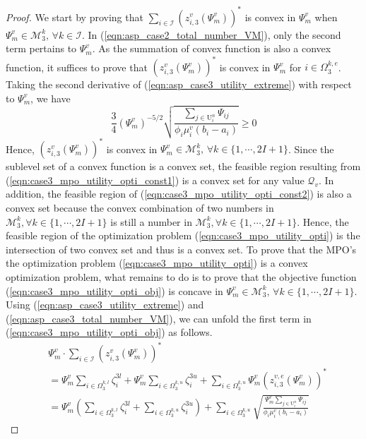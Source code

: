 \documentclass[conference]{IEEEtran}
\begin{document}
\begin{proof}
We start by proving that $\sum_{i \in \mathcal{I}} (z_{i,3}^v(\Psi_m^v))^*$ is convex in $\Psi_m^v$ when $\Psi_m^v \in \mathcal{M}_3^k,\, \forall k \in \mathcal{I}$. In (\ref{eqn:asp_case2_total_number_VM}), only the second term pertains to $\Psi_m^v$. As the summation of convex function is also a convex function, it suffices to prove that $(z_{i,3}^v(\Psi_m^v))^*$ is convex in $\Psi_m^v$ for $i \in \Omega_3^{k,e}$. Taking the second derivative of (\ref{eqn:asp_case3_utility_extreme}) with respect to $\Psi_m^v$, we have
\begin{equation}
\frac{3}{4}(\Psi_m^v)^{-5/2}\sqrt{\frac{\sum_{j \in \mathrm{U}_i^n}\Psi_{ij}}{\phi_i \mu_i^v(b_i-a_i)}}  \geq 0
\end{equation}
Hence, $(z_{i,3}^v(\Psi_m^v))^*$ is convex in $\Psi_m^v \in \mathcal{M}_3^k,\, \forall k \in \{1,\cdots, 2I+1\}$. Since the sublevel set of a convex function is a convex set, the feasible region resulting from (\ref{eqn:case3_mpo_utility_opti_const1}) is a convex set for any value $\mathcal{Q}_v$. In addition, the feasible region of (\ref{eqn:case3_mpo_utility_opti_const2}) is also a convex set because the convex combination of two numbers in $\mathcal{M}_3^k, \forall k \in \{1, \cdots, 2I+1\}$ is still a number in $\mathcal{M}_3^k, \forall k \in \{1, \cdots, 2I+1\}$. Hence, the feasible region of the optimization problem (\ref{eqn:case3_mpo_utility_opti}) is the intersection of two convex set and thus is a convex set. To prove that the MPO's the optimization problem (\ref{eqn:case3_mpo_utility_opti}) is a convex optimization problem, what remains to do is to prove that the objective function (\ref{eqn:case3_mpo_utility_opti_obj}) is concave in $\Psi_m^v \in \mathcal{M}_3^k,\, \forall k \in \{1,\cdots, 2I+1\}$. Using (\ref{eqn:asp_case3_utility_extreme}) and (\ref{eqn:asp_case3_total_number_VM}), we can unfold the first term in (\ref{eqn:case3_mpo_utility_opti_obj}) as follows.
\begin{align} \label{eqn:mpo_case3_utility_first_term}
&\Psi_m^v \cdot \sum_{i \in \mathcal{I}} (z_{i,3}^v(\Psi_m^v))^* \\
&= \Psi_m^v\sum_{i\in \Omega_3^{k,l}}\zeta_i^{3l} + \Psi_m^v\sum_{i\in \Omega_3^{k,u}}\zeta_i^{3u} + \sum_{i \in \Omega_3^{k,u}}\Psi_m^v(z_{i,3}^{v,e}(\Psi_m^v))^* \nonumber\\
& = \Psi_m^v (\sum_{i\in \Omega_3^{k,l}}\zeta_i^{3l} + \sum_{i\in \Omega_3^{k,u}}\zeta_i^{3u}) +\sum_{i \in \Omega_3^{k,u}} \sqrt{\frac{\Psi_m^v\sum_{j \in \mathrm{U}_i^n}\Psi_{ij}}{\phi_i \mu_i^v(b_i-a_i)}}  \nonumber

\end{align}
\end{proof}
\end{document}
